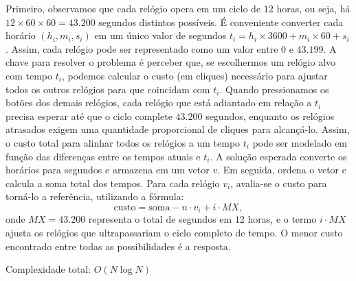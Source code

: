 Primeiro, observamos que cada relógio opera em um ciclo de $12$ horas, ou seja, há $12 \times 60 \times 60 = 43.200$ segundos distintos possíveis. É conveniente converter cada horário $(h_i, m_i, s_i)$ em um único valor de segundos $t_i = h_i \times 3600 + m_i \times 60 + s_i$. Assim, cada relógio pode ser representado como um valor entre $0$ e $43.199$.
A chave para resolver o problema é perceber que, se escolhermos um relógio alvo com tempo $t_i$, podemos calcular o custo (em cliques) necessário para ajustar todos os outros relógios para que coincidam com $t_i$. Quando pressionamos os botões dos demais relógios, cada relógio que está adiantado em relação a $t_i$ precisa esperar até que o ciclo complete $43.200$ segundos, enquanto os relógios atrasados exigem uma quantidade proporcional de cliques para alcançá-lo. Assim, o custo total para alinhar todos os relógios a um tempo $t_i$ pode ser modelado em função das diferenças entre os tempos atuais e $t_i$.
A solução esperada converte os horários para segundos e armazena em um vetor $v$. Em seguida, ordena o vetor e calcula a soma total dos tempos. Para cada relógio $v_i$, avalia-se o custo para torná-lo a referência, utilizando a fórmula:
\[
\text{custo} = \text{soma} - n \cdot v_i + i \cdot MX,
\]
onde $MX = 43.200$ representa o total de segundos em $12$ horas, e o termo $i \cdot MX$ ajusta os relógios que ultrapassariam o ciclo completo de tempo. O menor custo encontrado entre todas as possibilidades é a resposta.

Complexidade total: $O(N \log N)$

